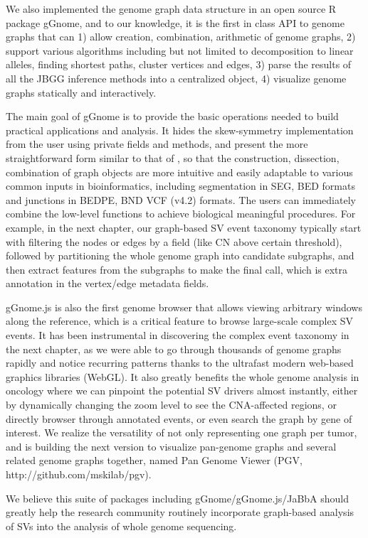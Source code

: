 \documentclass[phd,tocprelim]{cornell}
\begin{document}
We also implemented the genome graph data structure in an open source R package gGnome, and to our knowledge, it is the first in class API to genome graphs that can 1) allow creation, combination, arithmetic of genome graphs, 2) support various algorithms including but not limited to decomposition to linear alleles, finding shortest paths, cluster vertices and edges, 3) parse the results of all the JBGG inference methods into a centralized object, 4) visualize genome graphs statically and interactively.

The main goal of gGnome is to provide the basic operations needed to build practical applications and analysis. It hides the skew-symmetry implementation from the user using private fields and methods, and present the more straightforward form similar to that of \cite{Greenman:2012eg}, so that the construction, dissection, combination of graph objects are more intuitive and easily adaptable to various common inputs in bioinformatics, including segmentation in SEG, BED formats and junctions in BEDPE, BND VCF (v4.2) formats. The users can immediately combine the low-level functions to achieve biological meaningful procedures. For example, in the next chapter, our graph-based SV event taxonomy typically start with filtering the nodes or edges by a field (like CN above certain threshold), followed by partitioning the whole genome graph into candidate subgraphs, and then extract features from the subgraphs to make the final call, which is extra annotation in the vertex/edge metadata fields.

gGnome.js is also the first genome browser that allows viewing arbitrary windows along the reference, which is a critical feature to browse large-scale complex SV events. It has been instrumental in discovering the complex event taxonomy in the next chapter, as we were able to go through thousands of genome graphs rapidly and notice recurring patterns thanks to the ultrafast modern web-based graphics libraries (WebGL). It also greatly benefits the whole genome analysis in oncology where we can pinpoint the potential SV drivers almost instantly, either by dynamically changing the zoom level to see the CNA-affected regions, or directly browser through annotated events, or even search the graph by gene of interest. We realize the versatility of not only representing one graph per tumor, and is building the next version to visualize pan-genome graphs and several related genome graphs together, named Pan Genome Viewer (PGV, http://github.com/mskilab/pgv).

We believe this suite of packages including gGnome/gGnome.js/JaBbA should greatly help the research community routinely incorporate graph-based analysis of SVs into the analysis of whole genome sequencing.
\end{document}
